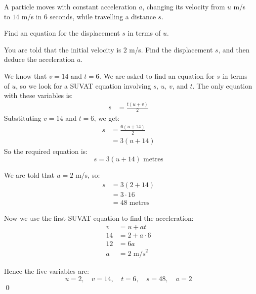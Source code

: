 \begin{example}
A particle moves with constant acceleration $a$, changing its velocity from $u$ m/s to $14$ m/s in $6$ seconds, while travelling a distance $s$.

Find an equation for the displacement $s$ in terms of $u$.

You are told that the initial velocity is $2$ m/s. Find the displacement $s$, and then deduce the acceleration $a$.

\end{example}
\begin{solution}
We know that $v = 14$ and $t = 6$. We are asked to find an equation for $s$ in terms of $u$, so we look for a SUVAT equation involving $s$, $u$, $v$, and $t$. The only equation with these variables is:
\begin{align*}
    s &= \frac{t(u + v)}{2}
\end{align*}
Substituting $v = 14$ and $t = 6$, we get:
\begin{align*}
    s &= \frac{6(u + 14)}{2} \\
    &= 3(u + 14)
\end{align*}
So the required equation is:
\[
s = 3(u + 14) \text{ metres}
\]

We are told that $u = 2$ m/s, so:
\begin{align*}
    s &= 3(2 + 14) \\
    &= 3 \cdot 16 \\
    &= 48 \text{ metres}
\end{align*}

Now we use the first SUVAT equation to find the acceleration:
\begin{align*}
    v &= u + at \\
    14 &= 2 + a \cdot 6 \\
    12 &= 6a \\
    a &= 2 \text{ m/s}^2
\end{align*}

Hence the five variables are:
\[
u = 2,\quad v = 14,\quad t = 6,\quad s = 48,\quad a = 2
\]
\qed
\end{solution}

